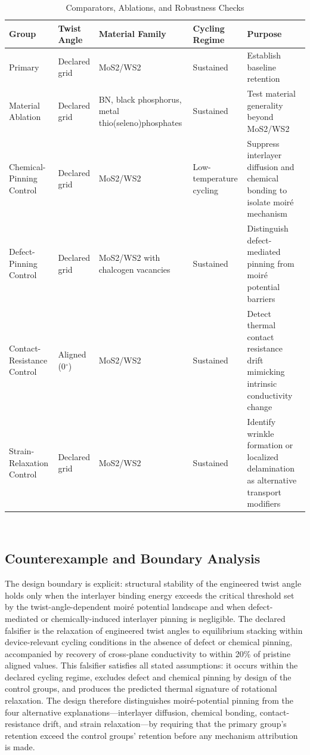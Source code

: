 \documentclass[conference]{IEEEtran}
\begin{document}
\begin{table}[htbp]
\centering
\footnotesize
\setlength{\tabcolsep}{3pt}
\renewcommand{\arraystretch}{1.12}
\caption{Comparators, Ablations, and Robustness Checks}
\label{tab:study-design-and-methods-b2-comparison}
\begin{tabular}{|p{}|p{}|p{}|p{}|p{}|}
\hline
Group & Twist Angle & Material Family & Cycling Regime & Purpose \\\hline
Primary & Declared grid & MoS2/WS2 & Sustained & Establish baseline retention \\\hline
Material Ablation & Declared grid & BN, black phosphorus, metal thio(seleno)phosphates & Sustained & Test material generality beyond MoS2/WS2 \\\hline
Chemical-Pinning Control & Declared grid & MoS2/WS2 & Low-temperature cycling & Suppress interlayer diffusion and chemical bonding to isolate moiré mechanism \\\hline
Defect-Pinning Control & Declared grid & MoS2/WS2 with chalcogen vacancies & Sustained & Distinguish defect-mediated pinning from moiré potential barriers \\\hline
Contact-Resistance Control & Aligned (0$^\circ$) & MoS2/WS2 & Sustained & Detect thermal contact resistance drift mimicking intrinsic conductivity change \\\hline
Strain-Relaxation Control & Declared grid & MoS2/WS2 & Sustained & Identify wrinkle formation or localized delamination as alternative transport modifiers \\\hline
\end{tabular}
\end{table}~\cite{cite_26ecaf73d88dfe33,cite_54b9175b8bb4c4e0,cite_78dc2ce387cb7c90,cite_a411cbbebf7838b9,cite_b9cc1fcb55e94349}

\subsection{Counterexample and Boundary Analysis}
The design boundary is explicit: structural stability of the engineered twist angle holds only when the interlayer binding energy exceeds the critical threshold set by the twist-angle-dependent moiré potential landscape and when defect-mediated or chemically-induced interlayer pinning is negligible. The declared falsifier is the relaxation of engineered twist angles to equilibrium stacking within device-relevant cycling conditions in the absence of defect or chemical pinning, accompanied by recovery of cross-plane conductivity to within 20\% of pristine aligned values. This falsifier satisfies all stated assumptions: it occurs within the declared cycling regime, excludes defect and chemical pinning by design of the control groups, and produces the predicted thermal signature of rotational relaxation. The design therefore distinguishes moiré-potential pinning from the four alternative explanations—interlayer diffusion, chemical bonding, contact-resistance drift, and strain relaxation—by requiring that the primary group's retention exceed the control groups' retention before any mechanism attribution is made.~\cite{cite_26ecaf73d88dfe33}
\end{document}
